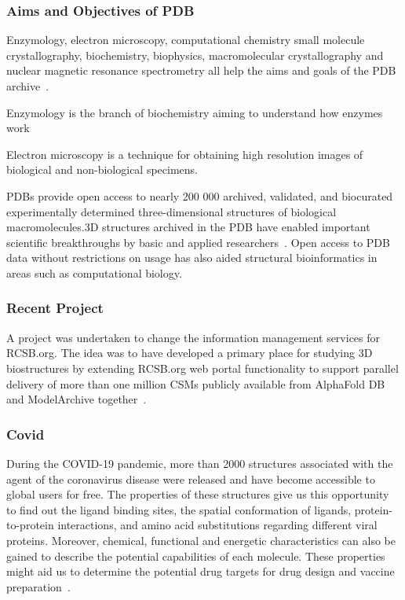 \documentclass[]{final_report}
\begin{document}
\subsubsection{Aims and Objectives of PDB}

Enzymology, electron microscopy, computational chemistry small molecule crystallography, biochemistry, biophysics, macromolecular crystallography and nuclear magnetic resonance spectrometry all help the aims and goals of the PDB archive~\cite{behzadi_worldwide_2021}.

\begin{definition}[Enzymology]
    Enzymology is the branch of biochemistry aiming to understand how enzymes work
\end{definition}

\begin{definition}
    Electron microscopy is a technique for obtaining high resolution images of biological and non-biological specimens.
\end{definition}

PDBs provide open access to nearly 200 000 archived, validated, and biocurated experimentally determined three-dimensional structures of biological macromolecules.3D structures archived in the PDB have enabled important scientific breakthroughs by basic and applied researchers~\cite{burley_impact_2021}. Open access to PDB data without restrictions on usage has also aided structural bioinformatics in areas such as computational biology.

\subsubsection{Recent Project}

A project was undertaken to change the information management services for RCSB.org. The idea was to have developed a primary place for studying 3D biostructures by extending RCSB.org web portal functionality to support parallel delivery of more than one million CSMs publicly available from AlphaFold DB and ModelArchive together~\cite{burley1_rcsb_2022}.

\subsubsection{Covid}

During the COVID-19 pandemic, more than 2000 structures associated with the agent of the coronavirus disease were released and have become accessible to global users for free. The properties of these structures give us this opportunity to find out the ligand binding sites, the spatial conformation of ligands, protein-to-protein interactions, and amino acid substitutions regarding different viral proteins. Moreover, chemical, functional and energetic characteristics can also be gained to describe the potential capabilities of each molecule. These properties might aid us to determine the potential drug targets for drug design and vaccine preparation~\cite{lubin_evolution_2020}.
\end{document}
